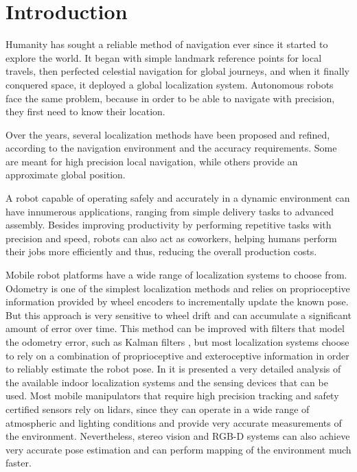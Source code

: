 \section{Introduction}\label{sec:introduction}

Humanity has sought a reliable method of navigation ever since it started to explore the world. It began with simple landmark reference points for local travels, then perfected celestial navigation for global journeys, and when it finally conquered space, it deployed a global localization system. Autonomous robots face the same problem, because in order to be able to navigate with precision, they first need to know their location.

Over the years, several localization methods have been proposed and refined, according to the navigation environment and the accuracy requirements. Some are meant for high precision local navigation, while others provide an approximate global position.

A robot capable of operating safely and accurately in a dynamic environment can have innumerous applications, ranging from simple delivery tasks to advanced assembly. Besides improving productivity by performing repetitive tasks with precision and speed, robots can also act as coworkers, helping humans perform their jobs more efficiently and thus, reducing the overall production costs.

Mobile robot platforms have a wide range of localization systems to choose from. Odometry is one of the simplest localization methods and relies on proprioceptive information provided by wheel encoders to incrementally update the known pose. But this approach is very sensitive to wheel drift and can accumulate a significant amount of error over time. This method can be improved with filters that model the odometry error, such as Kalman filters \cite{Wan2002}, but most localization systems choose to rely on a combination of proprioceptive and exteroceptive information in order to reliably estimate the robot pose. In \cite{Mautz2012} it is presented a very detailed analysis of the available indoor localization systems and the sensing devices that can be used. Most mobile manipulators that require high precision tracking and safety certified sensors rely on \glspl{lidar}, since they can operate in a wide range of atmospheric and lighting conditions and provide very accurate measurements of the environment. Nevertheless, stereo vision and RGB-D systems can also achieve very accurate pose estimation and can perform mapping of the environment much faster.

